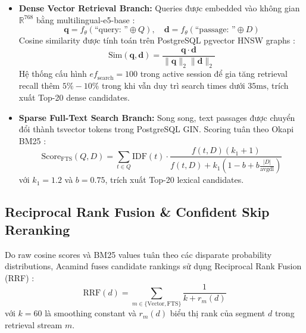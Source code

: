 \documentclass[10pt]{SPIIRAS_Proceedings}
\begin{document}
\begin{itemize}
    \item \textbf{Dense Vector Retrieval Branch:} Queries được embedded vào không gian $\mathbb{R}^{768}$ bằng multilingual-e5-base \cite{wang2022text}:
    \begin{equation}
    \mathbf{q} = f_{\theta}(\text{``query: ''} \oplus Q), \quad \mathbf{d} = f_{\theta}(\text{``passage: ''} \oplus D)
    \end{equation}
    Cosine similarity được tính toán trên PostgreSQL pgvector HNSW graphs \cite{malkov2020efficient}:
    \begin{equation}
    \text{Sim}(\mathbf{q}, \mathbf{d}) = \frac{\mathbf{q} \cdot \mathbf{d}}{\|\mathbf{q}\|_2 \|\mathbf{d}\|_2}
    \end{equation}
    Hệ thống cấu hình $\mathit{ef}_{\text{search}}=100$ trong active session để gia tăng retrieval recall thêm $5\%-10\%$ trong khi vẫn duy trì search times dưới $35\text{ms}$, trích xuất Top-20 dense candidates.
    \item \textbf{Sparse Full-Text Search Branch:} Song song, text passages được chuyển đổi thành tsvector tokens trong PostgreSQL GIN. Scoring tuân theo Okapi BM25 \cite{formal2021splade}:
    \begin{equation}
    \text{Score}_{\text{FTS}}(Q,D) = \sum_{t\in Q} \text{IDF}(t) \cdot \frac{f(t,D)(k_1+1)}{f(t,D)+k_1\left(1-b+b\frac{|D|}{\text{avgdl}}\right)}
    \end{equation}
    với $k_1=1.2$ và $b=0.75$, trích xuất Top-20 lexical candidates.
\end{itemize}

\subsection{Reciprocal Rank Fusion \& Confident Skip Reranking}
Do raw cosine scores và BM25 values tuân theo các disparate probability distributions, Acamind fuses candidate rankings sử dụng Reciprocal Rank Fusion (RRF) \cite{cormack2009reciprocal}:
\begin{equation}
\text{RRF}(d) = \sum_{m \in \{\text{Vector}, \text{FTS}\}} \frac{1}{k + r_m(d)}
\end{equation}
với $k=60$ là smoothing constant và $r_m(d)$ biểu thị rank của segment $d$ trong retrieval stream $m$.
\end{document}
